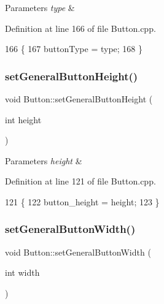 \begin{DoxyParams}{Parameters}
{\em type} & \\
\hline
\end{DoxyParams}


Definition at line 166 of file Button.\+cpp.


\begin{DoxyCode}
166                                           \{
167     buttonType = type;
168 \}
\end{DoxyCode}
\mbox{\label{class_button_aa3b0f5ac8b230e66983a83b6f4c8d440}} 
\subsubsection{\texorpdfstring{set\+General\+Button\+Height()}{setGeneralButtonHeight()}}
{\footnotesize\ttfamily void Button\+::set\+General\+Button\+Height (\begin{DoxyParamCaption}\item[{int}]{height }\end{DoxyParamCaption})}


\begin{DoxyParams}{Parameters}
{\em height} & \\
\hline
\end{DoxyParams}


Definition at line 121 of file Button.\+cpp.


\begin{DoxyCode}
121                                               \{
122     button\_height = height;
123 \}
\end{DoxyCode}
\mbox{\label{class_button_a15290e9b24eb7a52a698cc387670aed5}} 
\subsubsection{\texorpdfstring{set\+General\+Button\+Width()}{setGeneralButtonWidth()}}
{\footnotesize\ttfamily void Button\+::set\+General\+Button\+Width (\begin{DoxyParamCaption}\item[{int}]{width }\end{DoxyParamCaption})}


